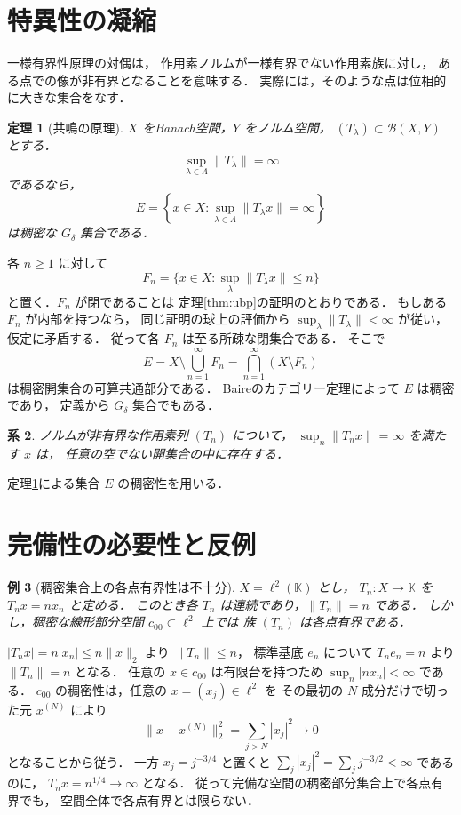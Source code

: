 \documentclass[a5paper,10pt,onecolumn]{jsarticle}
\makeatletter
\theoremstyle{mathnotetheorem}
\newtheorem{theorem}{定理}[section]
\newtheorem{corollary}[theorem]{系}
\newtheorem{example}[theorem]{例}
\renewcommand{\proofname}{証明}
\renewenvironment{proof}[1][\proofname]{%
  \par\pushQED{\qed}\normalfont\topsep4\p@\@plus2\p@\relax
  \trivlist\item[\hskip\labelsep\bfseries #1]\ignorespaces
}{\popQED\endtrivlist\@endpefalse}
\makeatother
\begin{document}
\section{特異性の凝縮}

一様有界性原理の対偶は，
作用素ノルムが一様有界でない作用素族に対し，
ある点での像が非有界となることを意味する．
実際には，そのような点は位相的に大きな集合をなす．

\begin{theorem}[共鳴の原理]\label{thm:condensation}
$X$ をBanach空間，$Y$ をノルム空間，
$(T_\lambda)\subset\mathcal B(X,Y)$ とする．
\[
 \sup_{\lambda\in\Lambda}\|T_\lambda\|=\infty
\]
であるなら，
\[
 E=\left\{x\in X:
  \sup_{\lambda\in\Lambda}\|T_\lambda x\|=\infty\right\}
\]
は稠密な $G_\delta$ 集合である．
\end{theorem}
\begin{proof}
各 $n\ge1$ に対して
\[
 F_n=\{x\in X:\sup_\lambda\|T_\lambda x\|\le n\}
\]
と置く．$F_n$ が閉であることは
定理\ref{thm:ubp}の証明のとおりである．
もしある $F_n$ が内部を持つなら，
同じ証明の球上の評価から
$\sup_\lambda\|T_\lambda\|<\infty$ が従い，
仮定に矛盾する．
従って各 $F_n$ は至る所疎な閉集合である．
そこで
\[
 E=X\setminus\bigcup_{n=1}^\infty F_n
   =\bigcap_{n=1}^\infty(X\setminus F_n)
\]
は稠密開集合の可算共通部分である．
Baireのカテゴリー定理によって $E$ は稠密であり，
定義から $G_\delta$ 集合でもある．
\end{proof}

\begin{corollary}
ノルムが非有界な作用素列 $(T_n)$ について，
$\sup_n\|T_nx\|=\infty$ を満たす $x$ は，
任意の空でない開集合の中に存在する．
\end{corollary}
\begin{proof}
定理\ref{thm:condensation}による集合 $E$ の稠密性を用いる．
\end{proof}

\section{完備性の必要性と反例}

\begin{example}[稠密集合上の各点有界性は不十分]
$X=\ell^2(\mathbb K)$ とし，
$T_n:X\to\mathbb K$ を $T_nx=nx_n$ と定める．
このとき各 $T_n$ は連続であり，$\|T_n\|=n$ である．
しかし，稠密な線形部分空間 $c_{00}\subset\ell^2$ 上では
族 $(T_n)$ は各点有界である．
\end{example}
\begin{proof}
$|T_nx|=n|x_n|\le n\|x\|_2$ より $\|T_n\|\le n$，
標準基底 $e_n$ について $T_ne_n=n$ より
$\|T_n\|=n$ となる．
任意の $x\in c_{00}$ は有限台を持つため
$\sup_n|nx_n|<\infty$ である．
$c_{00}$ の稠密性は，任意の $x=(x_j)\in\ell^2$ を
その最初の $N$ 成分だけで切った元 $x^{(N)}$ により
\[
 \|x-x^{(N)}\|_2^2=\sum_{j>N}|x_j|^2\to0
\]
となることから従う．
一方 $x_j=j^{-3/4}$ と置くと
$\sum_j|x_j|^2=\sum_jj^{-3/2}<\infty$ であるのに，
$T_nx=n^{1/4}\to\infty$ となる．
従って完備な空間の稠密部分集合上で各点有界でも，
空間全体で各点有界とは限らない．
\end{proof}
\end{document}
